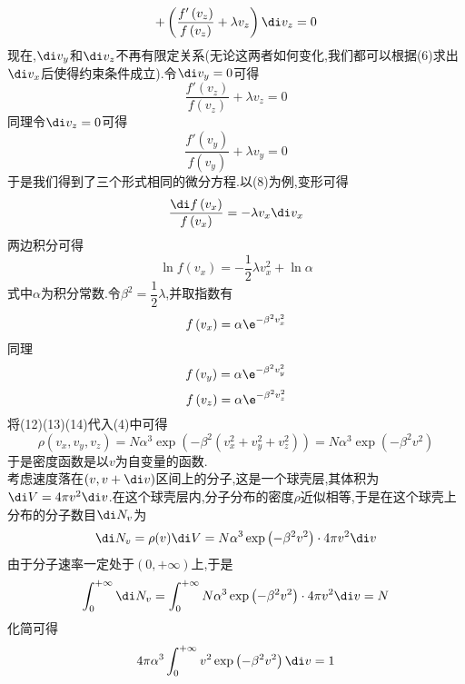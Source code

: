 \documentclass{ctexart}
\begin{document}
\begin{derivation}
\begin{equation}
        +\left(\dfrac{f'\left(v_z\right)}{f\left(v_z\right)}+\lambda v_z\right)\di v_z=0
    \end{equation}
    现在,$\di v_y$和$\di v_z$不再有限定关系(无论这两者如何变化,我们都可以根据(6)求出$\di v_x$后使得约束条件成立).令$\di v_y=0$可得
    \begin{equation}
        \dfrac{f'\left(v_z\right)}{f\left(v_z\right)}+\lambda v_z=0
    \end{equation}
    同理令$\di v_z=0$可得
    \begin{equation}
        \dfrac{f'\left(v_y\right)}{f\left(v_y\right)}+\lambda v_y=0
    \end{equation}
    于是我们得到了三个形式相同的微分方程.以(8)为例,变形可得
    \[\dfrac{\di f\left(v_x\right)}{f\left(v_x\right)}=-\lambda v_x\di v_x\]
    两边积分可得
    \[\ln f\left(v_x\right)=-\dfrac12\lambda v_x^2+\ln\alpha\]
    式中$\alpha$为积分常数.令$\beta^2=\dfrac12\lambda$,并取指数有
    \begin{equation}
        f\left(v_x\right)=\alpha\e^{-\beta^2v_x^2}
    \end{equation}
    同理
    \begin{equation}
        f\left(v_y\right)=\alpha\e^{-\beta^2v_y^2}
    \end{equation}
    \begin{equation}
        f\left(v_z\right)=\alpha\e^{-\beta^2v_z^2}
    \end{equation}
    将(12)(13)(14)代入(4)中可得
    \begin{equation}
        \rho\left(v_x,v_y,v_z\right)=N\alpha^3\exp\left(-\beta^2\left(v_x^2+v_y^2+v_z^2\right)\right)=N\alpha^3\exp\left(-\beta^2v^2\right)
    \end{equation}
    于是密度函数是以$v$为自变量的函数.\\
    考虑速度落在$(v,v+\di v)$区间上的分子,这是一个球壳层,其体积为$\di V=4\pi v^2\di v$.在这个球壳层内,分子分布的密度$\rho$近似相等,于是在这个球壳上分布的分子数目$\di N_v$为
    \begin{equation}
        \di N_v=\rho(v)\di V=N\alpha^3\exp\left(-\beta^2v^2\right)\cdot4\pi v^2\di v
    \end{equation}
    由于分子速率一定处于$(0,+\infty)$上,于是
    \begin{equation}
        \int_{0}^{+\infty}\di N_v=\int_{0}^{+\infty}N\alpha^3\exp\left(-\beta^2v^2\right)\cdot4\pi v^2\di v=N
    \end{equation}
    化简可得
    \[4\pi\alpha^3\int_0^{+\infty}v^2\exp\left(-\beta^2v^2\right)\di v=1\]

\end{derivation}
\end{document}

